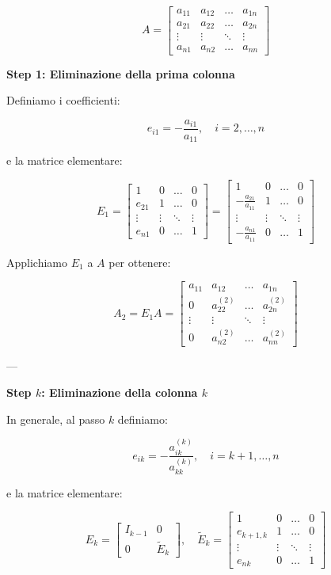 \documentclass[a4paper,12pt]{article}
\begin{document}
\begin{itemize}
\[
A = 
\begin{bmatrix}
a_{11} & a_{12} & \dots & a_{1n} \\
a_{21} & a_{22} & \dots & a_{2n} \\
\vdots & \vdots & \ddots & \vdots \\
a_{n1} & a_{n2} & \dots & a_{nn}
\end{bmatrix}
\]

\textbf{Step 1: Eliminazione della prima colonna}

Definiamo i coefficienti:

\[
e_{i1} = -\frac{a_{i1}}{a_{11}}, \quad i = 2, \dots, n
\]

e la matrice elementare:

\[
E_1 =
\begin{bmatrix}
1 & 0 & \dots & 0 \\
e_{21} & 1 & \dots & 0 \\
\vdots & \vdots & \ddots & \vdots \\
e_{n1} & 0 & \dots & 1
\end{bmatrix}
=
\begin{bmatrix}
1 & 0 & \dots & 0 \\
-\frac{a_{21}}{a_{11}} & 1 & \dots & 0 \\
\vdots & \vdots & \ddots & \vdots \\
-\frac{a_{n1}}{a_{11}} & 0 & \dots & 1
\end{bmatrix}
\]

Applichiamo \(E_1\) a \(A\) per ottenere:

\[
A_2 = E_1 A =
\begin{bmatrix}
a_{11} & a_{12} & \dots & a_{1n} \\
0 & a_{22}^{(2)} & \dots & a_{2n}^{(2)} \\
\vdots & \vdots & \ddots & \vdots \\
0 & a_{n2}^{(2)} & \dots & a_{nn}^{(2)}
\end{bmatrix}
\]

---

\textbf{Step \(k\): Eliminazione della colonna \(k\)}

In generale, al passo \(k\) definiamo:

\[
e_{ik} = -\frac{a_{ik}^{(k)}}{a_{kk}^{(k)}}, \quad i = k+1, \dots, n
\]

e la matrice elementare:

\[
E_k =
\begin{bmatrix}
I_{k-1} & 0 \\
0 & \tilde{E}_k
\end{bmatrix}, \quad
\tilde{E}_k =
\begin{bmatrix}
1 & 0 & \dots & 0 \\
e_{k+1,k} & 1 & \dots & 0 \\
\vdots & \vdots & \ddots & \vdots \\
e_{nk} & 0 & \dots & 1
\end{bmatrix}
\]


\end{itemize}
\end{document}
